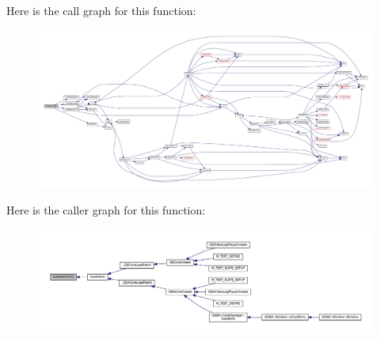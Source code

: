 Here is the call graph for this function\+:
\nopagebreak
\begin{figure}[H]
\begin{center}
\leavevmode
\includegraphics[width=350pt]{patch-ups_8c_abf626a98cecfdfd5e6aa40bfa285e494_cgraph}
\end{center}
\end{figure}
Here is the caller graph for this function\+:
\nopagebreak
\begin{figure}[H]
\begin{center}
\leavevmode
\includegraphics[width=350pt]{patch-ups_8c_abf626a98cecfdfd5e6aa40bfa285e494_icgraph}
\end{center}
\end{figure}
